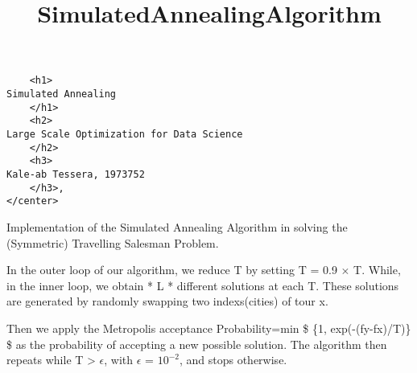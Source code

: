\documentclass[11pt]{article}
\title{SimulatedAnnealingAlgorithm}
\begin{document}
    
    
    \maketitle
    
    

    
    \begin{verbatim}
    <h1>
Simulated Annealing
    </h1>
    <h2>
Large Scale Optimization for Data Science
    </h2>
    <h3>
Kale-ab Tessera, 1973752
    </h3>,
</center>
\end{verbatim}

    Implementation of the Simulated Annealing Algorithm in solving the
(Symmetric) Travelling Salesman Problem.

In the outer loop of our algorithm, we reduce T by setting T = 0.9
\(\times\) T. While, in the inner loop, we obtain * L * different
solutions at each T. These solutions are generated by randomly swapping
two indexs(cities) of tour x.

Then we apply the Metropolis acceptance Probability=min \$ \{1,
exp(-(fy-fx)/T)\} \$ as the probability of accepting a new possible
solution. The algorithm then repeats while T \textgreater{}
\(\epsilon\), with \(\epsilon\) = \(10^{-2}\), and stops otherwise.
\end{document}

